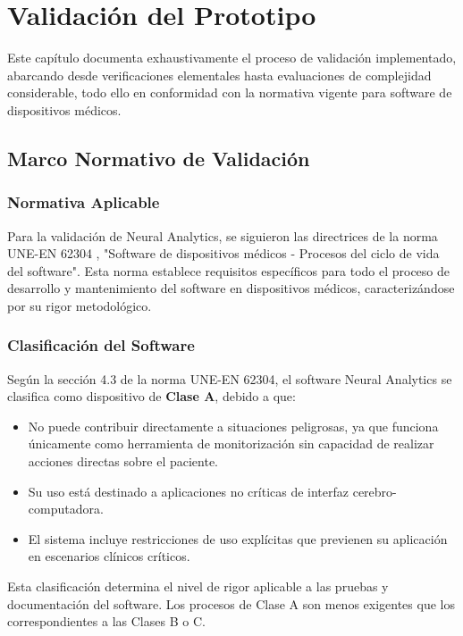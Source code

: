 \chapter{Validación del Prototipo}\label{ch:prototype_testing}

Este capítulo documenta exhaustivamente el proceso de validación implementado, abarcando desde verificaciones elementales hasta evaluaciones de complejidad considerable, todo ello en conformidad con la normativa vigente para software de dispositivos médicos. 

\section{Marco Normativo de Validación}

\subsection{Normativa Aplicable}

Para la validación de Neural Analytics, se siguieron las directrices de la norma UNE-EN 62304 \cite{UNE-EN-62304}, "Software de dispositivos médicos - Procesos del ciclo de vida del software". Esta norma establece requisitos específicos para todo el proceso de desarrollo y mantenimiento del software en dispositivos médicos, caracterizándose por su rigor metodológico.

\subsection{Clasificación del Software}

Según la sección 4.3 de la norma UNE-EN 62304, el software Neural Analytics se clasifica como dispositivo de \textbf{Clase A}, debido a que:

\begin{itemize}
    \item No puede contribuir directamente a situaciones peligrosas, ya que funciona únicamente como herramienta de monitorización sin capacidad de realizar acciones directas sobre el paciente.
    \item Su uso está destinado a aplicaciones no críticas de interfaz cerebro-computadora.
    \item El sistema incluye restricciones de uso explícitas que previenen su aplicación en escenarios clínicos críticos.
\end{itemize}

Esta clasificación determina el nivel de rigor aplicable a las pruebas y documentación del software. Los procesos de Clase A son menos exigentes que los correspondientes a las Clases B o C.


